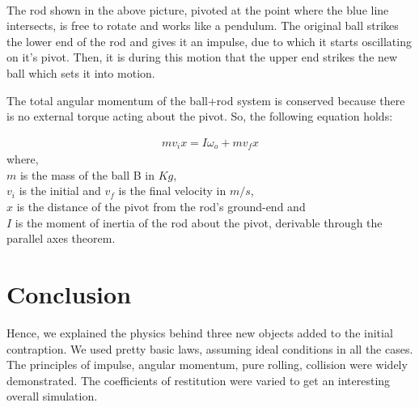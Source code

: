 \documentclass[11pt]{article}
\begin{document}
\setlength\fboxsep{2pt}
\setlength\fboxrule{1pt}
\\

The rod shown in the above picture, pivoted at the point where the blue line intersects, is free to rotate and works like a pendulum. The original ball strikes the lower end of the rod and gives it an impulse, due to which it starts oscillating on it's pivot. Then, it is during this motion that the upper end strikes the new ball which sets it into motion.

The total angular momentum of the ball+rod system is conserved because there is no external torque acting about the pivot. So, the following equation holds:

\begin{align}
mv_i x = I\omega_o + mv_f x
\end{align}
where,\\
$m$ is the mass of the ball B in $Kg$,\\
$v_i$ is the initial and $v_f$ is the final velocity in $m/s$,\\
$x$ is the distance of the pivot from the rod's ground-end and\\
$I$ is the moment of inertia of the rod about the pivot, derivable through the parallel axes theorem.

\pagebreak

\section{Conclusion}
Hence, we explained the physics behind three new objects added to the initial contraption. We used pretty basic laws, assuming ideal conditions in all the cases. The principles of impulse, angular momentum, pure rolling, collision were widely demonstrated. The coefficients of restitution were varied to get an interesting overall simulation. 


\end{document}
